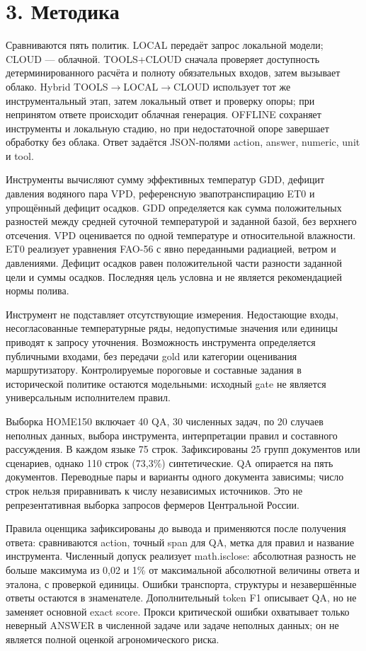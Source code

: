 \documentclass[14pt,a4paper]{extarticle}
\begin{document}
\section*{3. Методика}

Сравниваются пять политик. LOCAL передаёт запрос локальной модели; CLOUD --- облачной. TOOLS+CLOUD сначала проверяет доступность детерминированного расчёта и полноту обязательных входов, затем вызывает облако. Hybrid TOOLS\ensuremath{\to}LOCAL\ensuremath{\to}CLOUD использует тот же инструментальный этап, затем локальный ответ и проверку опоры; при непринятом ответе происходит облачная генерация. OFFLINE сохраняет инструменты и локальную стадию, но при недостаточной опоре завершает обработку без облака. Ответ задаётся JSON-полями action, answer, numeric, unit и tool.


Инструменты вычисляют сумму эффективных температур GDD, дефицит давления водяного пара VPD, референсную эвапотранспирацию ET0 и упрощённый дефицит осадков. GDD определяется как сумма положительных разностей между средней суточной температурой и заданной базой, без верхнего отсечения. VPD оценивается по одной температуре и относительной влажности. ET0 реализует уравнения FAO-56 с явно переданными радиацией, ветром и давлениями. Дефицит осадков равен положительной части разности заданной цели и суммы осадков. Последняя цель условна и не является рекомендацией нормы полива.


Инструмент не подставляет отсутствующие измерения. Недостающие входы, несогласованные температурные ряды, недопустимые значения или единицы приводят к запросу уточнения. Возможность инструмента определяется публичными входами, без передачи gold или категории оценивания маршрутизатору. Контролируемые пороговые и составные задания в исторической политике остаются модельными: исходный gate не является универсальным исполнителем правил.


Выборка HOME150 включает 40 QA, 30 численных задач, по 20 случаев неполных данных, выбора инструмента, интерпретации правил и составного рассуждения. В каждом языке 75 строк. Зафиксированы 25 групп документов или сценариев, однако 110 строк (73,3\%) синтетические. QA опирается на пять документов. Переводные пары и варианты одного документа зависимы; число строк нельзя приравнивать к числу независимых источников. Это не репрезентативная выборка запросов фермеров Центральной России.


Правила оценщика зафиксированы до вывода и применяются после получения ответа: сравниваются action, точный span для QA, метка для правил и название инструмента. Численный допуск реализует math.isclose: абсолютная разность не больше максимума из 0,02 и 1\% от максимальной абсолютной величины ответа и эталона, с проверкой единицы. Ошибки транспорта, структуры и незавершённые ответы остаются в знаменателе. Дополнительный token F1 описывает QA, но не заменяет основной exact score. Прокси критической ошибки охватывает только неверный ANSWER в численной задаче или задаче неполных данных; он не является полной оценкой агрономического риска.
\end{document}

